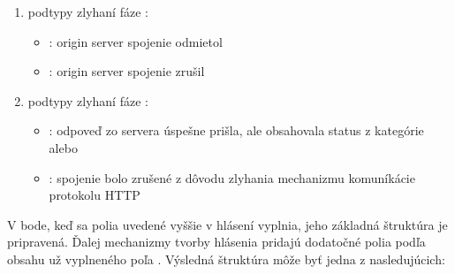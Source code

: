 \begin{itemize}
\begin{enumerate}
        \item podtypy zlyhaní fáze :
        \begin{itemize}
            \item {}: origin server spojenie odmietol
            \item {}: origin server spojenie zrušil 
        \end{itemize}
        
        \item podtypy zlyhaní fáze :
        \begin{itemize}
            \item {}: odpoveď zo servera úspešne prišla, ale obsahovala status z kategórie  alebo 
            
            \item {}: spojenie bolo zrušené z dôvodu zlyhania mechanizmu komuníkácie protokolu HTTP 
        \end{itemize}
    
    \end{enumerate}    
\end{itemize}

V bode, keď sa polia uvedené vyššie v hlásení vyplnia, jeho základná štruktúra je pripravená.
Ďalej mechanizmy tvorby hlásenia pridajú dodatočné polia podľa obsahu už vyplneného poľa .
Výsledná štruktúra môže byť jedna z nasledujúcich: 

